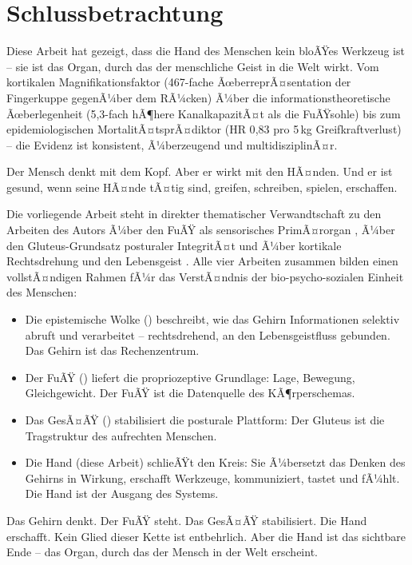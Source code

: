 ﻿\documentclass[12pt,a4paper]{report}
\theoremstyle{plain}
\theoremstyle{definition}
\theoremstyle{remark}
\begin{document}
\section{Schlussbetrachtung}

Diese Arbeit hat gezeigt, dass die Hand des Menschen kein bloÃŸes Werkzeug
ist -- sie ist das Organ, durch das der menschliche Geist in die Welt wirkt.
Vom kortikalen Magnifikationsfaktor (467-fache ÃœberreprÃ¤sentation der
Fingerkuppe gegenÃ¼ber dem RÃ¼cken) Ã¼ber die informationstheoretische
Ãœberlegenheit (5{,}3-fach hÃ¶here KanalkapazitÃ¤t als die FuÃŸsohle) bis zum
epidemiologischen MortalitÃ¤tsprÃ¤diktor (HR 0{,}83 pro 5\,kg Greifkraftverlust)
-- die Evidenz ist konsistent, Ã¼berzeugend und multidisziplinÃ¤r.

Der Mensch denkt mit dem Kopf. Aber er wirkt mit den HÃ¤nden. Und er ist
gesund, wenn seine HÃ¤nde tÃ¤tig sind, greifen, schreiben, spielen, erschaffen.

Die vorliegende Arbeit steht in direkter thematischer Verwandtschaft
zu den Arbeiten des Autors Ã¼ber den FuÃŸ als sensorisches PrimÃ¤rorgan
\cite{epp2026feed}, Ã¼ber den Gluteus-Grundsatz posturaler IntegritÃ¤t
\cite{epp2026butt} und Ã¼ber kortikale Rechtsdrehung und den Lebensgeist
\cite{epp2026brn}. Alle vier Arbeiten zusammen bilden einen vollstÃ¤ndigen
Rahmen fÃ¼r das VerstÃ¤ndnis der bio-psycho-sozialen Einheit des Menschen:

\begin{itemize}
\item Die epistemische Wolke (\cite{epp2026brn}) beschreibt, wie das
  Gehirn Informationen selektiv abruft und verarbeitet -- rechtsdrehend,
  an den Lebensgeistfluss gebunden. Das Gehirn ist das Rechenzentrum.
\item Der FuÃŸ (\cite{epp2026feed}) liefert die propriozeptive Grundlage:
  Lage, Bewegung, Gleichgewicht. Der FuÃŸ ist die
  Datenquelle des KÃ¶rperschemas.
\item Das GesÃ¤ÃŸ (\cite{epp2026butt}) stabilisiert die posturale Plattform:
  Der Gluteus ist die Tragstruktur des aufrechten Menschen.
\item Die Hand (diese Arbeit) schlieÃŸt den Kreis: Sie Ã¼bersetzt das
  Denken des Gehirns in Wirkung, erschafft Werkzeuge, kommuniziert,
  tastet und fÃ¼hlt. Die Hand ist der Ausgang des Systems.
\end{itemize}

Das Gehirn denkt. Der FuÃŸ steht. Das GesÃ¤ÃŸ stabilisiert. Die Hand erschafft.
Kein Glied dieser Kette ist entbehrlich. Aber die Hand ist das sichtbare
Ende -- das Organ, durch das der Mensch in der Welt erscheint.
\end{document}
